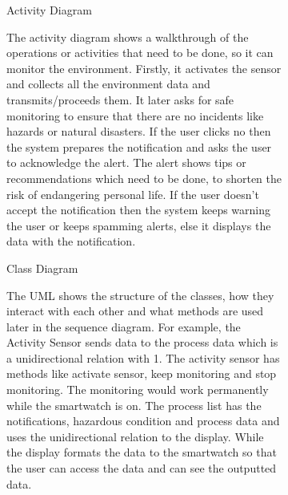 \documentclass{article}
\begin{document}
		\begin{figure}[htbp]
			\centering
			\begin{subfigure}{\textwidth}
				\resizebox{\textwidth}{!}{}
				\caption{Activity Diagram}
			\end{subfigure}
			\begin{subfigure}{\textwidth}
				The activity diagram shows a walkthrough of the operations or activities that need to be done, 
				so it can monitor the environment. Firstly, it activates the sensor and collects all the environment 
				data and transmits/proceeds them. It later asks for safe monitoring to ensure that there are no incidents 
				like hazards or natural disasters. If the user clicks no then the system prepares the notification and 
				asks the user to acknowledge the alert. The alert shows tips or recommendations which need to be done, to 
				shorten the risk of endangering personal life. If the user doesn’t accept the notification then the system 
				keeps warning the user or keeps spamming alerts, else it displays the data with the notification.
			\end{subfigure}
		\end{figure}
		\newpage

		\begin{figure}[htbp]
			\centering
			\begin{subfigure}{\textwidth}
				\resizebox{\textwidth}{!}{}
				\caption{Class Diagram}
			\end{subfigure}
			\begin{subfigure}{\textwidth}
				The UML shows the structure of the classes, how they interact with each other and what methods are 
				used later in the sequence diagram. For example, the Activity Sensor sends data to the process data 
				which is a unidirectional relation with 1. The activity sensor has methods like activate sensor, keep 
				monitoring and stop monitoring. The monitoring would work permanently while the smartwatch is on. The 
				process list has the notifications, hazardous condition and process data and uses the unidirectional 
				relation to the display. While the display formats the data to the smartwatch so that the user can access 
				the data and can see the outputted data. 
			\end{subfigure}
		\end{figure}
		\newpage
\end{document}

